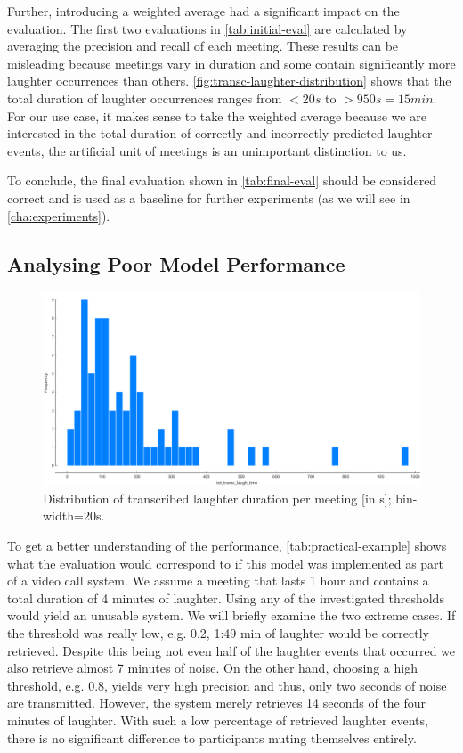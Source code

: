 \documentclass[bsc,frontabs,parskip,deptreport]{infthesis}
\begin{document}
Further, introducing a weighted average had a significant impact on the evaluation. The first two evaluations in \autoref{tab:initial-eval} are calculated by averaging the precision and recall of each meeting.
These results can be misleading because meetings vary in duration and some contain significantly more laughter occurrences than others.
\autoref{fig:transc-laughter-distribution} shows that the total duration of laughter occurrences ranges from $<20s$ to $>950s=15min$.
For our use case, it makes sense to take the weighted average because we are interested in the total duration of correctly and incorrectly predicted laughter events, the artificial unit of meetings is an unimportant distinction to us.

To conclude, the final evaluation shown in \autoref{tab:final-eval} should be considered correct and is used as a baseline for further experiments (as we will see in \autoref{cha:experiments}).



\subsection{Analysing Poor Model Performance}

\begin{figure}
    \centering
    \includegraphics[width=13cm]{imgs/distributions/transcribed_laughter_time_distribution.png}
    \caption{Distribution of transcribed laughter duration per meeting [in s]; bin-width=20s.}
    \label{fig:transc-laughter-distribution}
\end{figure}



To get a better understanding of the performance, \autoref{tab:practical-example} shows what the evaluation would correspond to if this model was implemented as part of a video call system. We assume a meeting that lasts 1 hour and contains a total duration of 4 minutes of laughter. 
Using any of the investigated thresholds would yield an unusable system.
We will briefly examine the two extreme cases. If the threshold was really low, e.g. 0.2, 1:49 min of laughter would be correctly retrieved. Despite this being not even half of the laughter events that occurred we also retrieve almost 7 minutes of noise.  
On the other hand, choosing a high threshold, e.g. 0.8, yields very high precision and thus, only two seconds of noise are transmitted. However, the system merely retrieves 14 seconds of the four minutes of laughter. With such a low percentage of retrieved laughter events, there is no significant difference to participants muting themselves entirely. 
\end{document}
